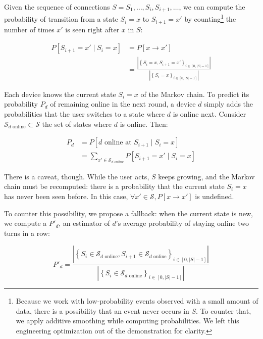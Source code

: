 Given the \squad sequence of connections $S = S_1, \dots, S_i, S_{i+1}, \dots$,
we can compute the probability of transition from a state $S_i=x$ to $S_{i+1}=x'$ by counting\footnote{%
	Because we work with low-probability events observed with a small amount of data, there is a possibility that an event never occurs in $S$. 
	To counter that, we apply additive smoothing while computing probabilities. 
	We left this engineering optimization out of the demonstration for clarity.
} the number of times $x'$ is seen right after $x$ in $S$:

\begin{align*}
P\left[S_{i+1}=x' \mid S_i=x \right] &= P\left[x \rightarrow x' \right] \\&= \frac{\left| \left\{ S_i = x, S_{i+1} = x' \right\}_{i \in \left[0, |S| - 1\right]} \right|}{\left| \left\{ S_i = x \right\}_{i \in \left[0, |S| - 1\right]} \right|}
\end{align*}

Each device knows the current state $S_i=x$ of the Markov chain.
To predict its probability $P_d$ of remaining online in the next round, 
a device $d$ simply adds the probabilities that the user switches to a state where $d$ is online next.
Consider $\mathcal{S}_{d\text{ online}} \subset \mathcal{S}$ the set of states where $d$ is online. Then:

\begin{align*}
P_d & = P\left[d\text{ online at }S_{i+1} \mid S_i=x\right] \\ & = \sum\limits_{x' \in \mathcal{S}_{d\text{ online}}} P\left[ S_{i+1}=x' \mid S_i=x \right]
\end{align*}

There is a caveat, though.
While the user acts, $S$ keeps growing, and the Markov chain must be recomputed: there is a probability that the current state $S_i=x$ has never been seen before.
In this case, $\forall x' \in \mathcal{S}, P\left[x \rightarrow x'\right]$ is undefined.

To counter this possibility, we propose a fallback:
when the current state is new, we compute a $P'_d$, an estimator of $d$'s average probability of staying online two turns in a row:

$$ P'_d = \frac{\left| \left\{ S_i \in \mathcal{S}_{d\text{ online}}, S_{i+1} \in \mathcal{S}_{d\text{ online}} \right\}_{i \in \left[0, |S| - 1\right]} \right|}{\left| \left\{ S_i \in \mathcal{S}_{d\text{ online}} \right\}_{i \in \left[0, |S| - 1\right]} \right|} $$

